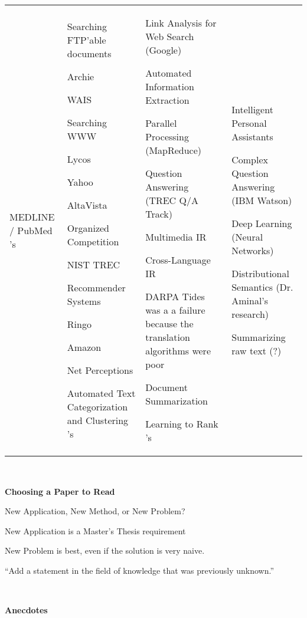 \documentclass[11pt]{article}
\begin{document}
\begin{spacing}{1.2}
\begin{tabular}{p{3cm}p{15cm}}
	\qquad MEDLINE / PubMed
	's &
	Searching FTP'able documents
	
	\qquad Archie
	
	\qquad WAIS
	
	Searching WWW
	
	\qquad Lycos
	
	\qquad Yahoo
	
	\qquad AltaVista
	
	Organized Competition
	
	\qquad NIST TREC
	
	Recommender Systems
	
	\qquad Ringo
	
	\qquad Amazon
	
	\qquad Net Perceptions
	
	Automated Text Categorization and Clustering	
	's &
	Link Analysis for Web Search (Google)
	
	Automated Information Extraction
	
	Parallel Processing (MapReduce)
	
	Question Answering (TREC Q/A Track)
	
	Multimedia IR
	
	Cross-Language IR
	
	\qquad DARPA Tides was a a failure because the translation algorithms were poor
	
	Document Summarization
	
	Learning to Rank
	's &
	Intelligent Personal Assistants
	
	Complex Question Answering (IBM Watson)
	
	Deep Learning (Neural Networks)

	Distributional Semantics (Dr. Aminal's research)
	
	\qquad Summarizing raw text (?)
	
\end{tabular}

\

{\bf Choosing a Paper to Read}

New Application, New Method, or New Problem?

New Application is a Master's Thesis requirement

New Problem is best, even if the solution is very naive.  

``Add a statement in the field of knowledge that was previously unknown.''

\

{\bf Anecdotes}


\end{spacing}
\end{document}
